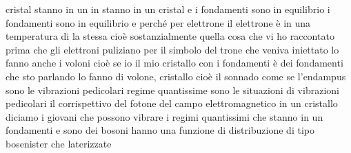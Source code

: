 cristal stanno in un in stanno in un cristal e i fondamenti sono in equilibrio i fondamenti sono in equilibrio e perché per elettrone il elettrone è in una temperatura di la stessa cioè sostanzialmente quella cosa che vi ho raccontato prima che gli elettroni puliziano per il simbolo del trone che veniva iniettato lo fanno anche i voloni cioè se io il mio cristallo con i fondamenti è dei fondamenti che sto parlando lo fanno di volone, cristallo cioè il sonnado come se l'endampus sono le vibrazioni pedicolari regime quantissime sono le situazioni di vibrazioni pedicolari il corrispettivo del fotone del campo elettromagnetico in un cristallo diciamo i giovani che possono vibrare i regimi quantissimi che stanno in un fondamenti e sono dei bosoni hanno una funzione di distribuzione di tipo bosenister che laterizzate 

